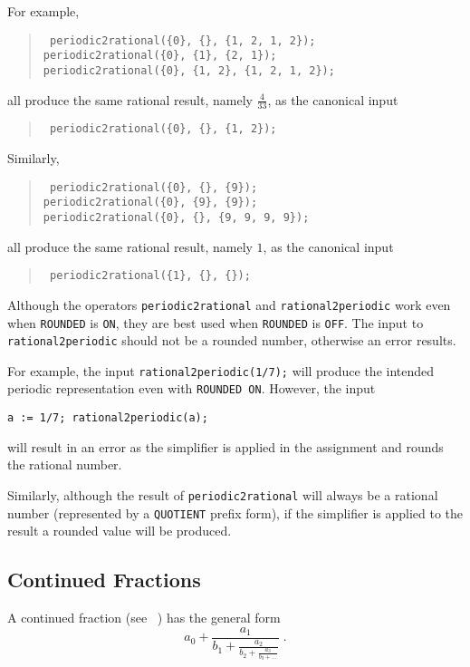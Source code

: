 For example,
\begin{quote}\tt
  periodic2rational(\{0\}, \{\}, \{1, 2, 1, 2\}); \\
  periodic2rational(\{0\}, \{1\}, \{2, 1\}); \\
  periodic2rational(\{0\}, \{1, 2\}, \{1, 2, 1, 2\});
\end{quote}
all produce the same rational result, namely $\frac{4}{33}$, as the canonical input
\begin{quote}\tt
  periodic2rational(\{0\}, \{\}, \{1, 2\});
\end{quote}
Similarly,
\begin{quote}\tt
  periodic2rational(\{0\}, \{\}, \{9\}); \\
  periodic2rational(\{0\}, \{9\}, \{9\}); \\
  periodic2rational(\{0\}, \{\}, \{9, 9, 9, 9\});
\end{quote}
all produce the same rational result, namely $1$, as the  canonical input
\begin{quote}\tt
  periodic2rational(\{1\}, \{\}, \{\});
\end{quote}

Although the operators \texttt{periodic2rational} and
\texttt{rational2periodic} work even when \texttt{ROUNDED} is \texttt{ON},
they are best used when \texttt{ROUNDED} is \texttt{OFF}. The input
to \texttt{rational2periodic} should not be a rounded number, otherwise
an error results.

For example, the input \texttt{rational2periodic(1/7);} will produce the
intended periodic representation even with \texttt{ROUNDED ON}. However,
 the input

\texttt{a := 1/7; rational2periodic(a);}

will result in an error as the simplifier is applied in the assignment and
rounds the rational number.

Similarly, although the result of \texttt{periodic2rational} will always be
a rational number (represented by a \texttt{QUOTIENT} prefix form), if the
simplifier is applied to the result a rounded value will be produced.

%
%
%
\subsection{Continued Fractions}
\label{sec:rataprx:cf}
A continued fraction (see ~\cite{JonesThron:80}) has the general form
{\Large
\[a_0 + \frac{a_1}{b_1 +
         \frac{a_2}{b_2+
          \frac{a_3}{b_3 + \ldots
        }}}
\;.\]
}

